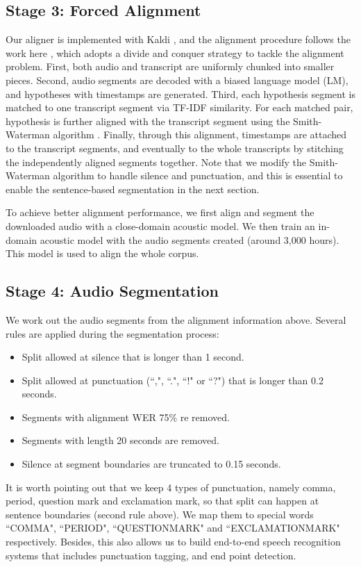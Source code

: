 \documentclass[a4paper]{article}
\begin{document}
\subsection{Stage 3: Forced Alignment}
Our aligner is implemented with Kaldi \cite{povey2011kaldi}, and the alignment
procedure follows the work here \cite{manohar2017jhu}, which adopts a divide and
conquer strategy to tackle the alignment problem. First, both audio and transcript
are uniformly chunked into smaller pieces. Second, audio segments are decoded with
a biased language model (LM), and hypotheses with timestamps are generated. Third, each hypothesis segment is matched to one transcript segment via TF-IDF similarity. For each matched pair, 
hypothesis is further aligned with the transcript segment using
the Smith-Waterman algorithm \cite{pearson1991searching}. Finally, through this alignment, timestamps are attached to the transcript segments,
and eventually to the whole transcripts by stitching the independently aligned segments together. Note that we modify the Smith-Waterman algorithm to handle silence and punctuation, and this is essential to enable the sentence-based segmentation in the next section.

To achieve better alignment performance, we first align and segment the
downloaded audio with a close-domain acoustic model. We then train an in-domain
acoustic model with the audio segments created (around 3,000 hours). This model
is used to align the whole corpus.

\subsection{Stage 4: Audio Segmentation}
We work out the audio segments from the alignment information above. Several
rules are applied during the segmentation process:
\begin{itemize}
  \item Split allowed at silence that is longer than 1 second.
  \item Split allowed at punctuation (``,", ``.", ``!" or ``?") that is
    longer than 0.2 seconds.
  \item Segments with alignment WER  75\% re removed.
  \item Segments with length  20 seconds are removed.
  \item Silence at segment boundaries are truncated to 0.15 seconds.
\end{itemize}

It is worth pointing out that we keep 4 types of punctuation, namely
comma, period, question mark and exclamation mark, so that split can happen at sentence boundaries (second rule above). We map them to special
words ``COMMA", ``PERIOD", ``QUESTIONMARK" and
``EXCLAMATIONMARK" respectively. Besides, this also allows us to build end-to-end
speech recognition systems that includes punctuation tagging, and end
point detection.
\end{document}
